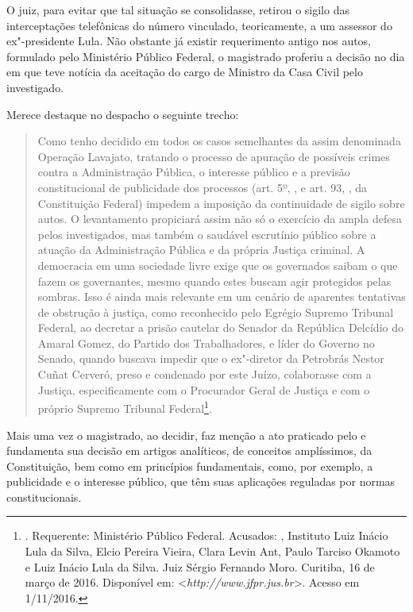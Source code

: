 O juiz, para evitar que tal situação se consolidasse, retirou o sigilo
das interceptações telefônicas do número vinculado, teoricamente, a um
assessor do ex"-presidente Lula. Não obstante já existir requerimento
antigo nos autos, formulado pelo Ministério Público Federal, o
magistrado proferiu a decisão no dia em que teve notícia da aceitação do
cargo de Ministro da Casa Civil pelo investigado.

Merece destaque no despacho o seguinte trecho:

\begin{quote}
Como tenho decidido em todos os casos semelhantes da assim
denominada Operação Lavajato, tratando o processo de apuração de
possíveis crimes contra a Administração Pública, o interesse público e a
previsão constitucional de publicidade dos processos (art. 5º, , e
art. 93, , da Constituição Federal) impedem a imposição da
continuidade de sigilo sobre autos. O levantamento propiciará assim não
só o exercício da ampla defesa pelos investigados, mas também o saudável
escrutínio público sobre a atuação da Administração Pública e da própria
Justiça criminal. A democracia em uma sociedade livre exige que os
governados saibam o que fazem os governantes, mesmo quando estes buscam
agir protegidos pelas sombras. Isso é ainda mais relevante em um
cenário de aparentes tentativas de obstrução à justiça, como reconhecido
pelo Egrégio Supremo Tribunal Federal, ao decretar a prisão cautelar do
Senador da República Delcídio do Amaral Gomez, do Partido dos
Trabalhadores, e líder do Governo no Senado, quando buscava impedir que
o ex"-diretor da Petrobrás Nestor Cuñat Cerveró, preso e condenado por
este Juízo, colaborasse com a Justiça, especificamente com o Procurador
Geral de Justiça e com o próprio Supremo Tribunal Federal\footnote{. Requerente: Ministério Público
  Federal. Acusados: ,
  Instituto Luiz Inácio Lula da Silva, Elcio Pereira Vieira, Clara Levin
  Ant, Paulo Tarciso Okamoto e Luiz Inácio Lula da Silva. Juiz Sérgio
  Fernando Moro. Curitiba, 16 de março de 2016. Disponível em:
  \textless{}\emph{http://www.jfpr.jus.br}\textgreater{}. Acesso em 1/11/2016.}.
\end{quote}

Mais uma vez o magistrado, ao decidir, faz menção a ato praticado pelo 
e fundamenta sua decisão em artigos analíticos, de conceitos
amplíssimos, da Constituição, bem como em princípios fundamentais, como,
por exemplo, a publicidade e o interesse público, que têm suas aplicações
reguladas por normas constitucionais.

